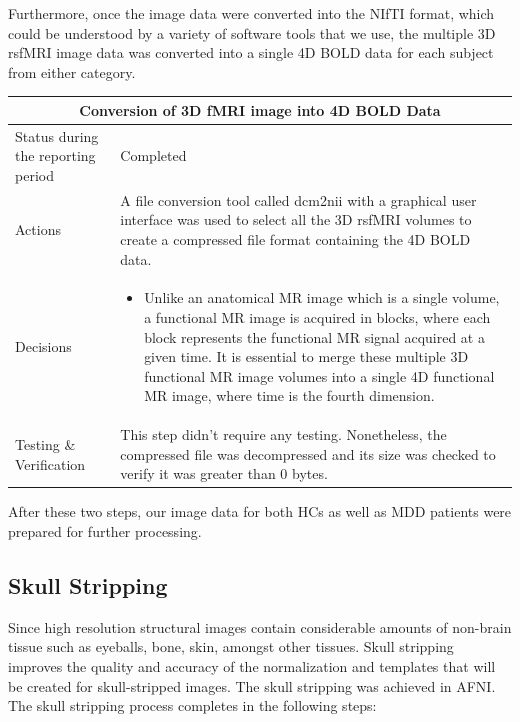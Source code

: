 \documentclass[12pt]{article}
\begin{document}
Furthermore, once the image data were converted into the NIfTI format,
which could be understood by a variety of software tools that we use,
the multiple 3D rsfMRI image data was converted into a single 4D BOLD
data for each subject from either category.

\begin{table}[H]
  \centering
  \begin{tabular} {| m{3.3cm} | m{11.5cm} | }
    \hline
    \multicolumn{2}{|c|}{Conversion of 3D fMRI image into 4D BOLD Data} \\ \hline
    Status during the reporting period & Completed   \\ \hline
    Actions &
    A file conversion tool called dcm2nii with a graphical user
    interface was used to select all the 3D rsfMRI volumes to create a
    compressed file format containing the 4D BOLD data.  \\ \hline

    Decisions &
    \begin{itemize}

      \item Unlike an anatomical MR image which is a single volume, a
        functional MR image is acquired in blocks, where each block
        represents the functional MR signal acquired at a given time.
        It is essential to merge these multiple 3D functional MR image
        volumes into a single 4D functional MR image, where time is
        the fourth dimension.

    \end{itemize} \\ \hline

    Testing \& Verification &
    This step didn't require any testing. Nonetheless, the compressed
    file was decompressed and its size was checked to verify it was
    greater than 0 bytes.  \\
    \hline
  \end{tabular}
\end{table}

After these two steps, our image data for both HCs as well as MDD
patients were prepared for further processing.

\newpage
\subsection{Skull Stripping}

Since high resolution structural images contain considerable amounts
of non-brain tissue such as eyeballs, bone, skin, amongst other
tissues. Skull stripping improves the quality and accuracy of the
normalization and templates that will be created for skull-stripped
images. The skull stripping was achieved in AFNI. The skull stripping
process completes in the following steps:
\end{document}
